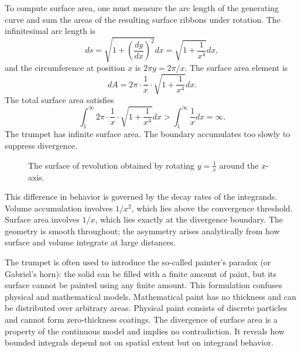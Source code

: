 To compute surface area, one must measure the arc length of the generating curve and sum the areas of the resulting surface ribbons under rotation. The infinitesimal arc length is
\[
ds = \sqrt{1 + \left( \frac{dy}{dx} \right)^2} dx = \sqrt{1 + \frac{1}{x^4}} dx,
\]
and the circumference at position \( x \) is \( 2\pi y = 2\pi/x \). The surface area element is
\[
dA = 2\pi \cdot \frac{1}{x} \cdot \sqrt{1 + \frac{1}{x^4}} dx.
\]
The total surface area satisfies
\[
\int_1^\infty 2\pi \cdot \frac{1}{x} \cdot \sqrt{1 + \frac{1}{x^4}} dx > \int_1^\infty \frac{1}{x} dx = \infty.
\]
The trumpet has infinite surface area. The boundary accumulates too slowly to suppress divergence.
\begin{figure}[h!]
\centering
{}
\caption{The surface of revolution obtained by rotating \( y = \frac{1}{x} \) around the \( x \)-axis.}
\end{figure}


This difference in behavior is governed by the decay rates of the integrands. Volume accumulation involves \( 1/x^2 \), which lies above the convergence threshold. Surface area involves \( 1/x \), which lies exactly at the divergence boundary. The geometry is smooth throughout; the asymmetry arises analytically from how surface and volume integrate at large distances.

The trumpet is often used to introduce the so-called painter’s paradox (or Gabriel's horn): the solid can be filled with a finite amount of paint, but its surface cannot be painted using any finite amount. This formulation confuses physical and mathematical models. Mathematical paint has no thickness and can be distributed over arbitrary areas. Physical paint consists of discrete particles and cannot form zero-thickness coatings. The divergence of surface area is a property of the continuous model and implies no contradiction. It reveals how bounded integrals depend not on spatial extent but on integrand behavior.

